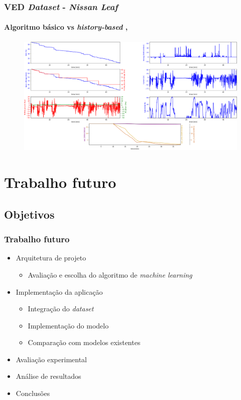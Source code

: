 \documentclass{beamer}
\begin{document}
\begin{frame}
	\frametitle{VED \textit{Dataset} - \textit{Nissan Leaf}}
	\framesubtitle{
		Algoritmo básico vs \textit{history-based} 
		, 
	}
	\vspace{-0.5cm}
	\begin{figure}[H]
		\begin{center}
			\includegraphics[scale=0.22]{./figures/demo_application_ved.png}
		\end{center}
	\end{figure}
	
\end{frame}

\section[Trabalho futuro]{Trabalho futuro}
\subsection{Objetivos}
\begin{frame}
\frametitle{Trabalho futuro}

\begin{itemize}
	\item Arquitetura de projeto
		  \begin{itemize}
			  \item Avaliação e escolha do algoritmo 
			  de \textit{machine learning}
		  \end{itemize} 
	\item Implementação da aplicação
		  \begin{itemize}
		      \item Integração do \textit{dataset}
		      \item Implementação do modelo
		      \item Comparação com modelos existentes
		  \end{itemize}
	\item Avaliação experimental
	\item Análise de resultados
	\item Conclusões
\end{itemize}

\end{frame}
\end{document}
